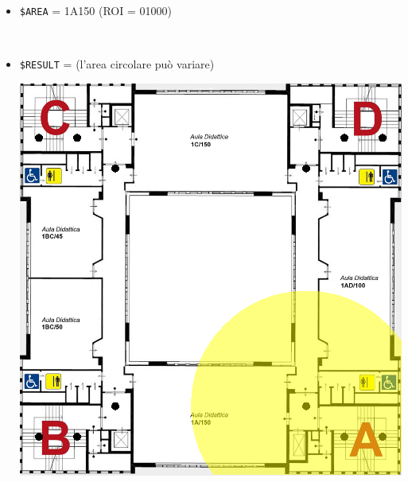 \documentclass[../../SperimentazioniPratiche.tex]{subfiles}
\begin{document}
			\paragraph*{}
			\label{2Prova10A.1}
			\begin{tcolorbox}[fonttitle=\bfseries, 
								adjusted title={\Large Prova 10A.1}, 
								breakable, 
								sharp corners=south,
								colback=white, 
								colframe=white!60!black]
								
				\begin{description}[leftmargin=0.7cm,labelwidth=!]
				
					\item[Input] \ \par 
        				\begin{itemize}
        					\item \verb|$AREA| = 1A150 (ROI = 01000)
        				\end{itemize}
        				
        			\tcbline 
        				
        			\item[Output atteso] \ \par
        				\begin{itemize}
        					\item \verb|$RESULT| = (l'area circolare può variare)
        					\begin{center}
        						\includegraphics[scale=0.3]{img/ResultProva10A}
        					\end{center}
        				\end{itemize}


\end{description}
\end{tcolorbox}
\end{document}

